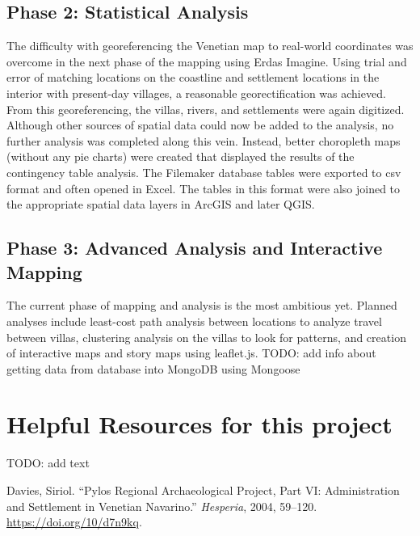 \documentclass[english,]{book}
\begin{document}
\hypertarget{phase-2-statistical-analysis}{%
\section{Phase 2: Statistical Analysis}\label{phase-2-statistical-analysis}}

The difficulty with georeferencing the Venetian map to real-world coordinates was overcome in the next phase of the mapping using Erdas Imagine. Using trial and error of matching locations on the coastline and settlement locations in the interior with present-day villages, a reasonable georectification was achieved. From this georeferencing, the villas, rivers, and settlements were again digitized. Although other sources of spatial data could now be added to the analysis, no further analysis was completed along this vein. Instead, better choropleth maps (without any pie charts) were created that displayed the results of the contingency table analysis. The Filemaker database tables were exported to csv format and often opened in Excel. The tables in this format were also joined to the appropriate spatial data layers in ArcGIS and later QGIS.

\hypertarget{phase-3-advanced-analysis-and-interactive-mapping}{%
\section{Phase 3: Advanced Analysis and Interactive Mapping}\label{phase-3-advanced-analysis-and-interactive-mapping}}

The current phase of mapping and analysis is the most ambitious yet. Planned analyses include least-cost path analysis between locations to analyze travel between villas, clustering analysis on the villas to look for patterns, and creation of interactive maps and story maps using leaflet.js.
TODO: add info about getting data from database into MongoDB using Mongoose

\hypertarget{resources}{%
\chapter{Helpful Resources for this project}\label{resources}}

TODO: add text

\hypertarget{refs}{}
\leavevmode\hypertarget{ref-daviesPylosRegionalArchaeological2004}{}%
Davies, Siriol. ``Pylos Regional Archaeological Project, Part VI: Administration and Settlement in Venetian Navarino.'' \emph{Hesperia}, 2004, 59--120. \url{https://doi.org/10/d7n9kq}.
\end{document}
